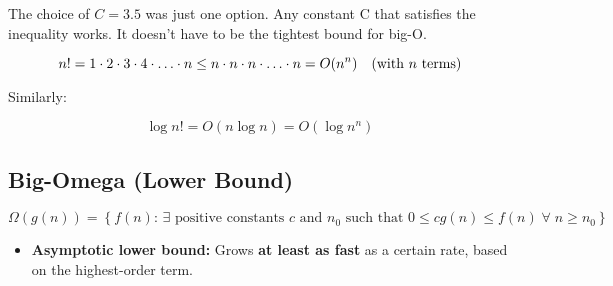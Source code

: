     \begin{warning}
        The choice of $C=3.5$ was just one option. Any constant C that satisfies the inequality works. It doesn't have to be the tightest bound for big-O.
    \end{warning}

    \begin{example}
        \[
        n! = 1 \cdot 2 \cdot 3 \cdot 4 \cdot \ldots \cdot n \leq n \cdot n \cdot n \cdot \ldots \cdot n = O(n^n) \quad \text{(with \( n \) terms)}
        \]

        Similarly:

        \[
        \log n! = O(n \log n) = O(\log n^n)
        \]
    \end{example}

\subsection{Big-Omega (Lower Bound)}
    \begin{definition}
        $ \Omega(g(n)) = \left\{ f(n) \text{: } \exists \text{ positive constants } c \text{ and } n_0 \text{ such that } 0 \leq c g(n) \leq f(n) \; \forall \; n \geq n_0 \right\} $
        \begin{itemize}
            \item \textbf{Asymptotic lower bound:} Grows \textbf{at least as fast} as a certain rate, based on the highest-order term.
        \end{itemize}
    \end{definition}

